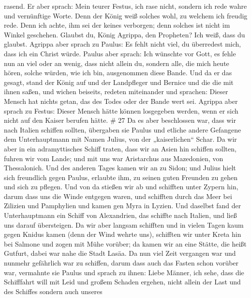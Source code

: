 rasend.  Er aber sprach: Mein teurer Festus, ich rase
nicht, sondern ich rede wahre und vernünftige Worte.  Denn
der König weiß solches wohl, zu welchem ich freudig rede. Denn ich
achte, ihm sei der keines verborgen; denn solches ist nicht im Winkel
geschehen.  Glaubst du, König Agrippa, den Propheten? Ich
weiß, dass du glaubst.  Agrippa aber sprach zu Paulus: Es
fehlt nicht viel, du überredest mich, dass ich ein Christ würde.
 Paulus aber sprach: Ich wünschte vor Gott, es fehle nun an
viel oder an wenig, dass nicht allein du, sondern alle, die mich heute
hören, solche würden, wie ich bin, ausgenommen diese Bande.
 Und da er das gesagt, stand der König auf und der
Landpfleger und Bernice und die die mit ihnen saßen,  und
wichen beiseits, redeten miteinander und sprachen: Dieser Mensch hat
nichts getan, das des Todes oder der Bande wert sei. 
Agrippa aber sprach zu Festus: Dieser Mensch hätte können losgegeben
werden, wenn er sich nicht auf den Kaiser berufen hätte. \# 27
 Da es aber beschlossen war, dass wir nach Italien schiffen
sollten, übergaben sie Paulus und etliche andere Gefangene dem
Unterhauptmann mit Namen Julius, von der „kaiserlichen`` Schar.
 Da wir aber in ein adramyttisches Schiff traten, dass wir
an Asien hin schiffen sollten, fuhren wir vom Lande; und mit uns war
Aristarchus aus Mazedonien, von Thessalonich.  Und des
anderen Tages kamen wir an zu Sidon; und Julius hielt sich freundlich
gegen Paulus, erlaubte ihm, zu seinen guten Freunden zu gehen und sich
zu pflegen.  Und von da stießen wir ab und schifften unter
Zypern hin, darum dass uns die Winde entgegen waren,  und
schifften durch das Meer bei Zilizien und Pamphylien und kamen gen Myra
in Lyzien.  Und daselbst fand der Unterhauptmann ein Schiff
von Alexandrien, das schiffte nach Italien, und ließ uns darauf
übersteigen.  Da wir aber langsam schifften und in vielen
Tagen kaum gegen Knidus kamen (denn der Wind wehrte uns), schifften wir
unter Kreta hin bei Salmone  und zogen mit Mühe vorüber; da
kamen wir an eine Stätte, die heißt Gutfurt, dabei war nahe die Stadt
Lasäa.  Da nun viel Zeit vergangen war und nunmehr
gefährlich war zu schiffen, darum dass auch das Fasten schon vorüber
war, vermahnte sie Paulus  und sprach zu ihnen: Liebe
Männer, ich sehe, dass die Schifffahrt will mit Leid und großem Schaden
ergehen, nicht allein der Last und des Schiffes sondern auch unseres
